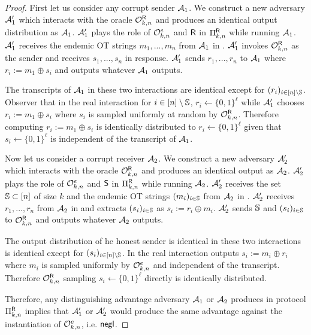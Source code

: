 \begin{proof}
	First let us consider any corrupt sender $\mathcal{A}_1$. We construct a new adversary $\mathcal{A}_1'$ which interacts with the oracle $\mathcal{O}^{\mathsf{R}}_{k,n}$ and produces an identical output distribution as $\mathcal{A}_1$.  $\mathcal{A}_1'$ plays the role of $\mathcal{O}^{e}_{k,n}$ and $\mathsf{R}$ in $\Pi^{\mathsf{R}}_{k,n}$ while running $\mathcal{A}_1$. $\mathcal{A}_1'$ receives the endemic OT strings $m_1,...,m_n$ from $\mathcal{A}_1$ in . $\mathcal{A}_1'$ invokes $\mathcal{O}^{\mathsf{R}}_{k,n}$ as the sender and receives $s_1,...,s_n$ in response. $\mathcal{A}_1'$ sends $r_1,...,r_n$ to $\mathcal{A}_1$ where $r_i:=m_1\oplus s_i$ and 	 outputs whatever $\mathcal{A}_1$ outputs.
	
	The transcripts of $\mathcal{A}_1$ in these two interactions are identical except for $(r_i)_{i\in [n]\setminus \mathsf{\mathbb S}}$. Observer that in the real interaction for $i\in [n]\setminus\mathsf{\mathbb S}$, $r_i\gets\{0,1\}^\ell$ while $\mathcal{A}_1'$ chooses $r_i:=m_1\oplus s_i$ where $s_i$ is sampled uniformly at random by $\mathcal{O}^{\mathsf{R}}_{k,n}$. Therefore computing $r_i:=m_1\oplus s_i$ is identically distributed to $r_i\gets\{0,1\}^\ell$ given that $s_i\gets\{0,1\}^\ell$ is independent of the transcript of $\mathcal{A}_1$. 
	
	
	Now let us consider a corrupt receiver $\mathcal{A}_2$. We construct a new adversary $\mathcal{A}_2'$ which interacts with the oracle $\mathcal{O}^{\mathsf{R}}_{k,n}$ and produces an identical output as $\mathcal{A}_2$. $\mathcal{A}_2'$ plays the role of $\mathcal{O}^{e}_{k,n}$ and $\mathsf{S}$ in $\Pi^{\mathsf{R}}_{k,n}$ while running $\mathcal{A}_2$. $\mathcal{A}_2'$ receives the set $\mathsf{\mathbb S}\subset[n]$ of size $k$ and the endemic OT strings $(m_i)_{i\in \mathsf{\mathbb S}}$ from $\mathcal{A}_2$ in . $\mathcal{A}_2'$ receives $r_1,...,r_n$ from $\mathcal{A}_2$ in  and extracts $(s_i)_{i\in \mathsf{\mathbb S}}$ as $s_i:=r_i\oplus m_i$. $\mathcal{A}_2'$ sends $\mathsf{\mathbb S}$ and $(s_i)_{i\in \mathsf{\mathbb S}}$ to $\mathcal{O}^{\mathsf{R}}_{k,n}$ and outputs whatever $\mathcal{A}_2$ outputs.
	
	The output distribution of he honest sender is identical in these two interactions is identical except for $(s_i)_{i\in [n]\setminus \mathsf{\mathbb S}}$. In the real interaction \send outputs $s_i:=m_i\oplus r_i$ where $m_i$ is sampled uniformly by $\mathcal{O}^{e}_{k,n}$ and independent of the transcript. Therefore $\mathcal{O}^{\mathsf{R}}_{k,n}$ sampling $s_i\gets\{0,1\}^\ell$ directly is identically distributed.
	
	Therefore, any distinguishing advantage adversary $\mathcal{A}_1$ or $\mathcal{A}_2$ produces in protocol $\Pi^{\mathsf{R}}_{k,n}$ implies  that $\mathcal{A}_1'$ or $\mathcal{A}_2'$ would produce the same advantage against the instantiation of $\mathcal{O}^{e}_{k,n}$, i.e. $\mathsf{negl}$.
\end{proof}



